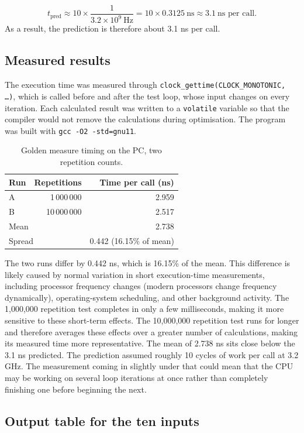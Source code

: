 \documentclass[11pt]{article}
\begin{document}
\[
t_{\text{pred}} \approx 10 \times \frac{1}{3.2 \times 10^{9}~\text{Hz}}
= 10 \times 0.3125~\text{ns} \approx 3.1~\text{ns per call}.
\]
\noindent
As a result, the prediction is therefore about 3.1 ns per call.

\subsection{Measured results}
The execution time was measured through
\texttt{clock\_gettime(CLOCK\_MONOTONIC, \ldots)}, which is called before and after the test loop,
whose input changes on every iteration. Each calculated result was written to a
\texttt{volatile} variable so that the compiler would not remove the calculations during optimisation. The program was
built with \texttt{gcc -O2 -std=gnu11}.

\begin{table}[h]
\centering
\begin{tabular}{lrr}
\toprule
Run & Repetitions & Time per call (ns) \\
\midrule
A & 1\,000\,000 & 2.959 \\
B & 10\,000\,000 & 2.517 \\
\midrule
\multicolumn{2}{l}{Mean} & 2.738 \\
\multicolumn{2}{l}{Spread} & 0.442 (16.15\% of mean) \\
\bottomrule
\end{tabular}
\caption{Golden measure timing on the PC, two repetition counts.}
\label{tab:pc-timing}
\end{table}
\noindent
The two runs differ by 0.442 ns, which is 16.15\% of the mean. This difference is likely caused by normal variation in short execution-time measurements, including processor frequency changes (modern processors change frequency dynamically), operating-system scheduling, and other background activity. The 1,000,000 repetition test completes in only a few milliseconds, making it more sensitive to these short-term effects. The 10,000,000 repetition test runs for longer and therefore averages these effects over a greater number of calculations, making its measured time more representative. 
\noindent
The mean of 2.738 ns sits close below the 3.1 ns predicted. The prediction
assumed roughly 10 cycles of work per call at 3.2 GHz. The measurement coming
in slightly under that could mean that the CPU may be working on several loop iterations at once rather than completely finishing one before beginning the next.

\subsection{Output table for the ten inputs}
\end{document}
